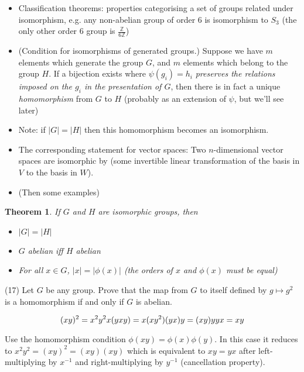 \documentclass[1    0pt, answers]{exam} \renewcommand{\baselinestretch}{1.05}
\theoremstyle{plain}
\newtheorem{theorem}{Theorem}
\theoremstyle{definition}
\begin{document}
\begin{questions}
\begin{itemize}
\item Classification theorems: properties categorising a set of groups related under isomorphism, e.g. any non-abelian group of order 6 is isomorphism to $S_3$ (the only other order 6 group is $\frac{\mathbb{Z}}{6 \mathbb{Z}}$) %
\item (Condition for isomorphisms of generated groups.) Suppose we have $m$ elements which generate the group $G$, and $m$ elements which belong to the group $H$. If a bijection exists where $\psi(g_i) = h_i$ \emph{preserves the relations imposed on the $g_i$ in the presentation of $G$}, then there is in fact a unique \emph{homomorphism} from $G$ to $H$ (probably as an extension of $\psi$, but we'll see later)
\item Note: if $|G| = |H|$ then this homomorphism becomes an isomorphism.
\item The corresponding statement for vector spaces: Two $n$-dimensional vector spaces are isomorphic by (some invertible linear transformation of the basis in $V$ to the basis in $W$).
\item (Then some examples)
\end{itemize}

\begin{theorem}
If $G$ and $H$ are isomorphic groups, then
\begin{itemize}
\item $|G| = |H|$
\item $G$ abelian iff $H$ abelian
\item For all $x \in G$, $|x| = |\phi(x)|$ (the orders of $x$ and $\phi(x)$ must be equal)
\end{itemize}
\end{theorem}

\question (17) Let $G$ be any group. Prove that the map from $G$ to itself defined by $g \mapsto g^2$ is a homomorphism if and only if $G$ is abelian.
\begin{solution}
\[
(xy)^2 = x^2y^2\\
x (y xy) = x (x y^2)\\
(y x) y = (x y) y\\
y x = x y\\
\]
\end{solution}

\begin{solution}
Use the homomorphism condition $\phi(xy) = \phi(x)\phi(y)$. In this case it reduces to $x^2 y^2 = (xy)^2 = (xy)(xy)$ which is equivalent to $xy = yx$ after left-multiplying by $x^{-1}$ and right-multiplying by $y^{-1}$ (cancellation property).
\end{solution}


\end{questions}
\end{document}
